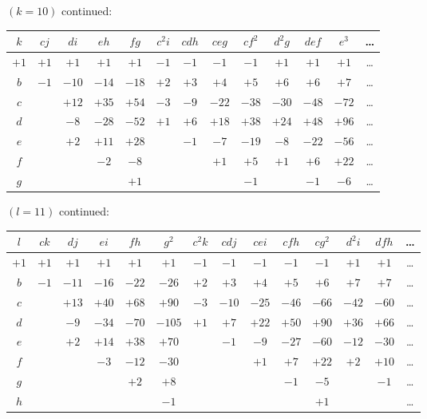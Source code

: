 \documentclass[12pt,a4paper]{article}
\theoremstyle{definition}
\begin{document}
\medskip

\noindent $(k = 10)$ continued:
\begin{center}
\small
\begin{tabular}{|c|c|c|c|c|c|c|c|c|c|c|c|c|}
\hline
$k$ & $cj$ & $di$ & $eh$ & $fg$ & $c^2i$ & $cdh$ & $ceg$ & $cf^2$ & $d^2g$ & $def$ & $e^3$ & \dots \\
\hline
$+1$ & $+1$ & $+1$ & $+1$ & $+1$ & $-1$ & $-1$ & $-1$ & $-1$ & $+1$ & $+1$ & $+1$ & \dots \\
$b$ & $-1$ & $-10$ & $-14$ & $-18$ & $+2$ & $+3$ & $+4$ & $+5$ & $+6$ & $+6$ & $+7$ & \dots \\
$c$ & & $+12$ & $+35$ & $+54$ & $-3$ & $-9$ & $-22$ & $-38$ & $-30$ & $-48$ & $-72$ & \dots \\
$d$ & & $-8$ & $-28$ & $-52$ & $+1$ & $+6$ & $+18$ & $+38$ & $+24$ & $+48$ & $+96$ & \dots \\
$e$ & & $+2$ & $+11$ & $+28$ & & $-1$ & $-7$ & $-19$ & $-8$ & $-22$ & $-56$ & \dots \\
$f$ & & & $-2$ & $-8$ & & & $+1$ & $+5$ & $+1$ & $+6$ & $+22$ & \dots \\
$g$ & & & & $+1$ & & & & $-1$ & & $-1$ & $-6$ & \dots \\
\hline
\end{tabular}
\end{center}

\medskip

\noindent $(l = 11)$ continued:
\begin{center}
\small
\begin{tabular}{|c|c|c|c|c|c|c|c|c|c|c|c|c|c|}
\hline
$l$ & $ck$ & $dj$ & $ei$ & $fh$ & $g^2$ & $c^2k$ & $cdj$ & $cei$ & $cfh$ & $cg^2$ & $d^2i$ & $dfh$ & \dots \\
\hline
$+1$ & $+1$ & $+1$ & $+1$ & $+1$ & $+1$ & $-1$ & $-1$ & $-1$ & $-1$ & $-1$ & $+1$ & $+1$ & \dots \\
$b$ & $-1$ & $-11$ & $-16$ & $-22$ & $-26$ & $+2$ & $+3$ & $+4$ & $+5$ & $+6$ & $+7$ & $+7$ & \dots \\
$c$ & & $+13$ & $+40$ & $+68$ & $+90$ & $-3$ & $-10$ & $-25$ & $-46$ & $-66$ & $-42$ & $-60$ & \dots \\
$d$ & & $-9$ & $-34$ & $-70$ & $-105$ & $+1$ & $+7$ & $+22$ & $+50$ & $+90$ & $+36$ & $+66$ & \dots \\
$e$ & & $+2$ & $+14$ & $+38$ & $+70$ & & $-1$ & $-9$ & $-27$ & $-60$ & $-12$ & $-30$ & \dots \\
$f$ & & & $-3$ & $-12$ & $-30$ & & & $+1$ & $+7$ & $+22$ & $+2$ & $+10$ & \dots \\
$g$ & & & & $+2$ & $+8$ & & & & $-1$ & $-5$ & & $-1$ & \dots \\
$h$ & & & & & $-1$ & & & & & $+1$ & & & \dots \\
\hline
\end{tabular}
\end{center}
\end{document}
